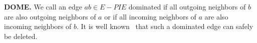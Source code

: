 
\textbf{DOME.} We call an edge $ab \in E - PIE$ dominated if all outgoing neighbors of $b$ are also outgoing neighbors of  $a$ or if all incoming neighbors of $a$ are also incoming neighbors of $b$. It is well known~\cite{diestel} that such a dominated edge can safely be deleted. 